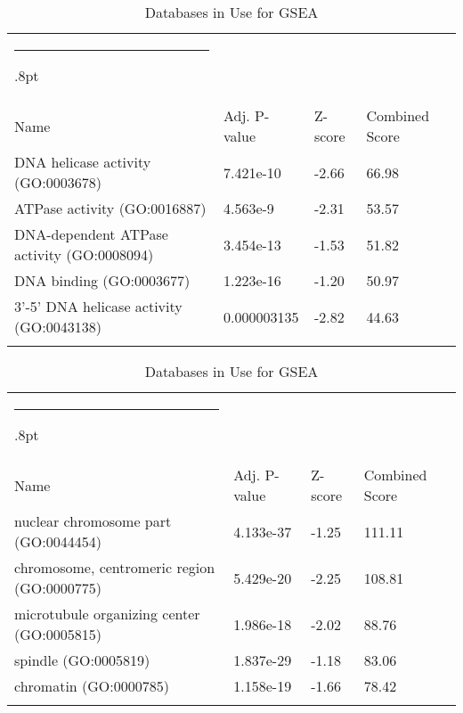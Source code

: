 \documentclass[3p,authoryear,preprint,12pt]{elsarticle}
\makeatletter
\def\hlinewd#1{%
  \noalign{\ifnum0=`}\fi\hrule \@height #1%
  \futurelet\reserved@a\@xhline}
\def\tbltoprule{\hlinewd{.8pt}\\[-12pt]}
\def\tblbottomrule{\noalign{\vspace*{6pt}}\hline\noalign{\vspace*{2pt}}}
\def\tblmidrule{\noalign{\vspace*{6pt}}\hline\noalign{\vspace*{2pt}}}
\makeatother
\begin{document}
\begin{table*}[!htbp]
	\caption{{Databases in Use for GSEA} }
	\label{tw-de478ae31cc6}
	\def\arraystretch{1}
	\ignorespaces 
	\centering 
	\begin{tabulary}{\linewidth}{p{\dimexpr.65\tabcolsep}p{\dimexpr.15\tabcolsep}p{\dimexpr.1\tabcolsep}p{\dimexpr.1\tabcolsep}}
		\tbltoprule Name & Adj. P-value & Z-score & Combined Score\\
		\tblmidrule
DNA helicase activity (GO:0003678) & 7.421e-10 & -2.66 & 66.98 \\
ATPase activity (GO:0016887) & 4.563e-9 & -2.31 & 53.57 \\
DNA-dependent ATPase activity (GO:0008094) & 3.454e-13 & -1.53 & 51.82 \\
DNA binding (GO:0003677) & 1.223e-16 & -1.20 & 50.97 \\
3'-5' DNA helicase activity (GO:0043138) & 0.000003135 & -2.82 & 44.63 \\
		\tblbottomrule
	\end{tabulary}\par 
\end{table*}
\begin{table*}[!htbp]
	\caption{{Databases in Use for GSEA} }
	\label{tw-de478ae31cc6}
	\def\arraystretch{1}
	\ignorespaces 
	\centering 
	\begin{tabulary}{\linewidth}{p{\dimexpr.65\tabcolsep}p{\dimexpr.15\tabcolsep}p{\dimexpr.1\tabcolsep}p{\dimexpr.1\tabcolsep}}
		\tbltoprule Name & Adj. P-value & Z-score & Combined Score\\
		\tblmidrule
nuclear chromosome part (GO:0044454) & 4.133e-37 & -1.25 & 111.11 \\
chromosome, centromeric region (GO:0000775) & 5.429e-20 & -2.25 & 108.81 \\
microtubule organizing center (GO:0005815) & 1.986e-18 & -2.02 & 88.76 \\
spindle (GO:0005819) & 1.837e-29 & -1.18 & 83.06 \\
chromatin (GO:0000785) & 1.158e-19 & -1.66 & 78.42 \\
		\tblbottomrule
	\end{tabulary}\par 
\end{table*}
\end{document}
